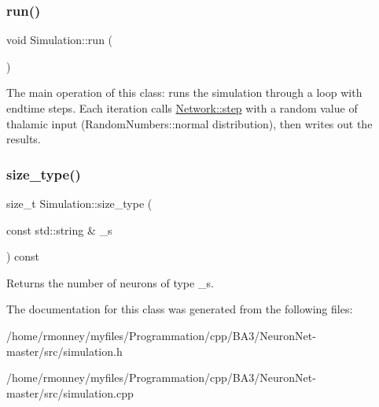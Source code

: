 \subsubsection{\texorpdfstring{run()}{run()}}
{\footnotesize\ttfamily void Simulation\+::run (\begin{DoxyParamCaption}{ }\end{DoxyParamCaption})}

The main operation of this class\+: runs the simulation through a loop with endtime steps. Each iteration calls \hyperlink{classNetwork_a53665a3a69e6ec894c313d0ce3fb7f34}{Network\+::step} with a random value of thalamic input (Random\+Numbers\+::normal distribution), then writes out the results. \mbox{\label{classSimulation_a7d0ca858dfec187001ecbab2081f9d04}} 
\subsubsection{\texorpdfstring{size\+\_\+type()}{size\_type()}}
{\footnotesize\ttfamily size\+\_\+t Simulation\+::size\+\_\+type (\begin{DoxyParamCaption}\item[{const std\+::string \&}]{\+\_\+s }\end{DoxyParamCaption}) const}

Returns the number of neurons of type \+\_\+s. 

The documentation for this class was generated from the following files\+:\begin{DoxyCompactItemize}
\item 
/home/rmonney/myfiles/\+Programmation/cpp/\+B\+A3/\+Neuron\+Net-\/master/src/simulation.\+h\item 
/home/rmonney/myfiles/\+Programmation/cpp/\+B\+A3/\+Neuron\+Net-\/master/src/simulation.\+cpp\end{DoxyCompactItemize}
